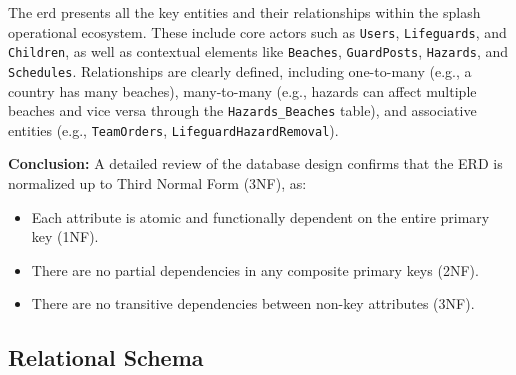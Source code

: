 The \ac{erd} presents all the key entities and their relationships within the \ac{splash} operational ecosystem. These include core actors such as \texttt{Users}, \texttt{Lifeguards}, and \texttt{Children}, as well as contextual elements like \texttt{Beaches}, \texttt{GuardPosts}, \texttt{Hazards}, and \texttt{Schedules}. Relationships are clearly defined, including one-to-many (e.g., a country has many beaches), many-to-many (e.g., hazards can affect multiple beaches and vice versa through the \texttt{Hazards\_Beaches} table), and associative entities (e.g., \texttt{TeamOrders}, \texttt{LifeguardHazardRemoval}).

\newpage
\textbf{Conclusion:} A detailed review of the database design confirms that the ERD is normalized up to Third Normal Form (3NF), as:
\begin{itemize}
    \item Each attribute is atomic and functionally dependent on the entire primary key (1NF).
    \item There are no partial dependencies in any composite primary keys (2NF).
    \item There are no transitive dependencies between non-key attributes (3NF).
\end{itemize}

\newpage
\subsection{Relational Schema}
\label{subsection:RE-schema}

